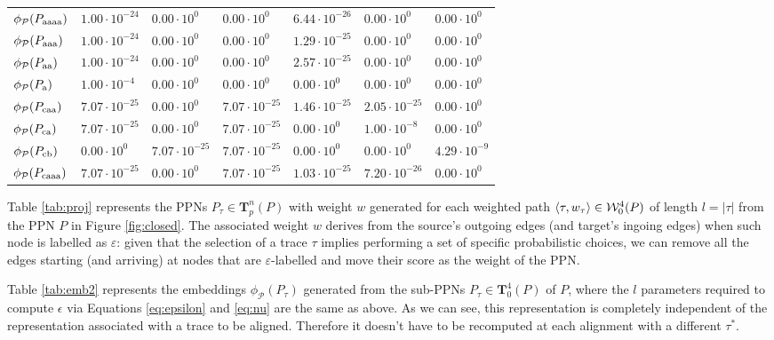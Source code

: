 \begin{table}[!t]
\begin{tabular}{l|l|l|l|l|l|l|}
		
		$\phi_{\mathcal{P}}(P_\textup{aaaa})$ & $1.00\cdot 10^{-24}$ & $0.00\cdot 10^{0}$ & $0.00\cdot 10^{0}$& $6.44\cdot 10^{-26}$& $0.00\cdot 10^{0}$& $0.00\cdot 10^{0}$\\
		$\phi_{\mathcal{P}}(P_\textup{aaa})$ & $1.00\cdot 10^{-24}$ & $0.00\cdot 10^{0}$ & $0.00\cdot 10^{0}$& $1.29\cdot 10^{-25}$& $0.00\cdot 10^{0}$& $0.00\cdot 10^{0}$\\
		$\phi_{\mathcal{P}}(P_\textup{aa})$ & $1.00\cdot 10^{-24}$ & $0.00\cdot 10^{0}$ & $0.00\cdot 10^{0}$& $2.57\cdot 10^{-25}$& $0.00\cdot 10^{0}$& $0.00\cdot 10^{0}$\\
		$\phi_{\mathcal{P}}(P_\textup{a})$ & $1.00\cdot 10^{-4}$ & $0.00\cdot 10^{0}$ & $0.00\cdot 10^{0}$& $0.00\cdot 10^{0}$& $0.00\cdot 10^{0}$& $0.00\cdot 10^{0}$\\
		$\phi_{\mathcal{P}}(P_\textup{caa})$ & $7.07\cdot 10^{-25}$ & $0.00\cdot 10^{0}$ & $7.07\cdot 10^{-25}$& $1.46\cdot 10^{-25}$& $2.05\cdot 10^{-25}$& $0.00\cdot 10^{0}$\\
		$\phi_{\mathcal{P}}(P_\textup{ca})$ & $7.07\cdot 10^{-25}$ & $0.00\cdot 10^{0}$ & $7.07\cdot 10^{-25}$& $0.00\cdot 10^{0}$& $1.00\cdot 10^{-8}$& $0.00\cdot 10^{0}$\\
		$\phi_{\mathcal{P}}(P_\textup{cb})$ &  $0.00\cdot 10^{0}$ & $7.07\cdot 10^{-25}$ & $7.07\cdot 10^{-25}$& $0.00\cdot 10^{0}$&  $0.00\cdot 10^{0}$ & $4.29\cdot 10^{-9}$\\
		$\phi_{\mathcal{P}}(P_\textup{caaa})$  & $7.07\cdot 10^{-25}$ &  $0.00\cdot 10^{0}$ & $7.07\cdot 10^{-25}$& $1.03\cdot 10^{-25}$&  $7.20\cdot 10^{-26}$ & $0.00\cdot 10^{0}$\\
		\bottomrule
	\end{tabular}
\end{table}
\begin{example}\label{ex:explainembed}
	Table \ref{tab:proj} represents the PPNs $P_\tau\in\mathbf{T}_p^n(P)$ with weight $w$ generated for each weighted path $\braket{\tau,w_\tau}\in \mathcal{W}_0^4(P)$ of length $l=|\tau|$ from the PPN $P$ in Figure \ref{fig:closed}. The associated weight $w$ derives from the source's outgoing edges (and target's ingoing edges) when such node is labelled as $\varepsilon$: given that the selection of a trace $\tau$ implies performing a set of specific probabilistic choices, we can remove all the edges starting (and arriving) at nodes that are $\varepsilon$-labelled and move their score as the weight of the PPN. 

Table \ref{tab:emb2} represents the embeddings $\phi_{\mathcal{P}}(P_\tau)$ generated from the sub-PPNs $P_\tau\in \mathbf{T}_0^4(P)$ of $P$, where the $l$ parameters required to compute $\epsilon$ via Equations \ref{eq:epsilon} and \ref{eq:nu} are the same as above. As we can see, this representation is completely independent of the representation associated with a trace to be aligned. Therefore it doesn't have to be recomputed at each alignment with a different $\tau^*$.
\end{example}



